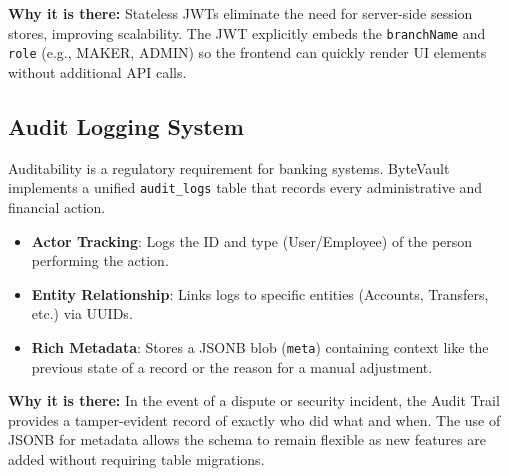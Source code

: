 \textbf{Why it is there:} Stateless JWTs eliminate the need for server-side session stores, improving scalability. The JWT explicitly embeds the \texttt{branchName} and \texttt{role} (e.g., MAKER, ADMIN) so the frontend can quickly render UI elements without additional API calls.
\subsection{Audit Logging System}
Auditability is a regulatory requirement for banking systems. ByteVault implements a unified \texttt{audit\_logs} table that records every administrative and financial action.

\begin{itemize}
    \item \textbf{Actor Tracking}: Logs the ID and type (User/Employee) of the person performing the action.
    \item \textbf{Entity Relationship}: Links logs to specific entities (Accounts, Transfers, etc.) via UUIDs.
    \item \textbf{Rich Metadata}: Stores a JSONB blob (\texttt{meta}) containing context like the previous state of a record or the reason for a manual adjustment.
\end{itemize}

\textbf{Why it is there:} In the event of a dispute or security incident, the Audit Trail provides a tamper-evident record of exactly who did what and when. The use of JSONB for metadata allows the schema to remain flexible as new features are added without requiring table migrations.
